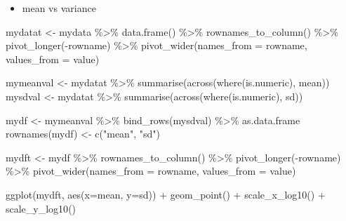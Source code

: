 \documentclass[
]{book}
\newenvironment{Shaded}{\begin{snugshade}}{\end{snugshade}}
\newcommand{\AttributeTok}[1]{\textcolor[rgb]{0.77,0.63,0.00}{#1}}
\newcommand{\FunctionTok}[1]{\textcolor[rgb]{0.00,0.00,0.00}{#1}}
\newcommand{\NormalTok}[1]{#1}
\newcommand{\OtherTok}[1]{\textcolor[rgb]{0.56,0.35,0.01}{#1}}
\newcommand{\SpecialCharTok}[1]{\textcolor[rgb]{0.00,0.00,0.00}{#1}}
\newcommand{\StringTok}[1]{\textcolor[rgb]{0.31,0.60,0.02}{#1}}
\providecommand{\tightlist}{%
  \setlength{\itemsep}{0pt}\setlength{\parskip}{0pt}}
\begin{document}
\begin{itemize}
\tightlist
\item
  mean vs variance
\end{itemize}

\begin{Shaded}
\begin{Highlighting}[]

\NormalTok{mydatat }\OtherTok{\textless{}{-}}\NormalTok{ mydata }\SpecialCharTok{\%\textgreater{}\%} 
  \FunctionTok{data.frame}\NormalTok{() }\SpecialCharTok{\%\textgreater{}\%} 
  \FunctionTok{rownames\_to\_column}\NormalTok{()  }\SpecialCharTok{\%\textgreater{}\%} 
  \FunctionTok{pivot\_longer}\NormalTok{(}\SpecialCharTok{{-}}\NormalTok{rowname) }\SpecialCharTok{\%\textgreater{}\%}
  \FunctionTok{pivot\_wider}\NormalTok{(}\AttributeTok{names\_from =}\NormalTok{ rowname, }\AttributeTok{values\_from =}\NormalTok{ value)}

\NormalTok{mymeanval }\OtherTok{\textless{}{-}}\NormalTok{ mydatat }\SpecialCharTok{\%\textgreater{}\%} 
  \FunctionTok{summarise}\NormalTok{(}\FunctionTok{across}\NormalTok{(}\FunctionTok{where}\NormalTok{(is.numeric), mean))}
\NormalTok{mysdval }\OtherTok{\textless{}{-}}\NormalTok{ mydatat }\SpecialCharTok{\%\textgreater{}\%} 
  \FunctionTok{summarise}\NormalTok{(}\FunctionTok{across}\NormalTok{(}\FunctionTok{where}\NormalTok{(is.numeric), sd))}

\NormalTok{mydf }\OtherTok{\textless{}{-}}\NormalTok{ mymeanval }\SpecialCharTok{\%\textgreater{}\%} 
  \FunctionTok{bind\_rows}\NormalTok{(mysdval) }\SpecialCharTok{\%\textgreater{}\%} 
\NormalTok{  as.data.frame}
\FunctionTok{rownames}\NormalTok{(mydf) }\OtherTok{\textless{}{-}} \FunctionTok{c}\NormalTok{(}\StringTok{"mean"}\NormalTok{, }\StringTok{"sd"}\NormalTok{)}

\NormalTok{mydft }\OtherTok{\textless{}{-}}\NormalTok{ mydf }\SpecialCharTok{\%\textgreater{}\%} 
  \FunctionTok{rownames\_to\_column}\NormalTok{() }\SpecialCharTok{\%\textgreater{}\%} 
  \FunctionTok{pivot\_longer}\NormalTok{(}\SpecialCharTok{{-}}\NormalTok{rowname) }\SpecialCharTok{\%\textgreater{}\%} 
  \FunctionTok{pivot\_wider}\NormalTok{(}\AttributeTok{names\_from =}\NormalTok{ rowname, }\AttributeTok{values\_from =}\NormalTok{ value)}

\FunctionTok{ggplot}\NormalTok{(mydft, }\FunctionTok{aes}\NormalTok{(}\AttributeTok{x=}\NormalTok{mean, }\AttributeTok{y=}\NormalTok{sd)) }\SpecialCharTok{+}
  \FunctionTok{geom\_point}\NormalTok{() }\SpecialCharTok{+}
  \FunctionTok{scale\_x\_log10}\NormalTok{() }\SpecialCharTok{+}
  \FunctionTok{scale\_y\_log10}\NormalTok{()}
  
\end{Highlighting}
\end{Shaded}
\end{document}
